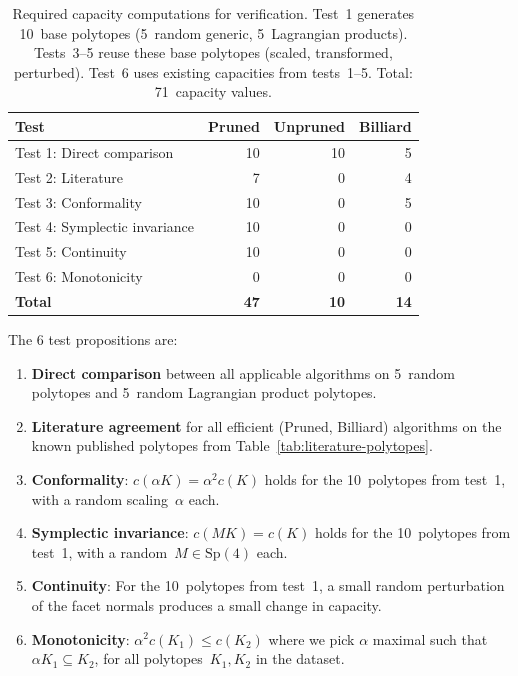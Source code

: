 \begin{table}[h]
\centering
\small
\begin{tabular}{lrrr}
\toprule
Test & Pruned & Unpruned & Billiard \\
\midrule
Test 1: Direct comparison & 10 & 10 & 5 \\
Test 2: Literature & 7 & 0 & 4 \\
Test 3: Conformality & 10 & 0 & 5 \\
Test 4: Symplectic invariance & 10 & 0 & 0 \\
Test 5: Continuity & 10 & 0 & 0 \\
Test 6: Monotonicity & 0 & 0 & 0 \\
\midrule
\textbf{Total} & \textbf{47} & \textbf{10} & \textbf{14} \\
\bottomrule
\end{tabular}
\caption{Required capacity computations for verification. Test~1 generates
  10~base polytopes (5~random generic, 5~Lagrangian products). Tests~3--5
  reuse these base polytopes (scaled, transformed, perturbed). Test~6 uses
  existing capacities from tests~1--5. Total: 71~capacity values.}
\label{tab:verification-capacity-counts}
\end{table}

The 6 test propositions are:
\begin{enumerate}
  \item \textbf{Direct comparison} between all applicable algorithms on
    5~random polytopes and 5~random Lagrangian product polytopes.

  \item \textbf{Literature agreement} for all efficient (Pruned, Billiard)
    algorithms on the known published polytopes from
    Table~\ref{tab:literature-polytopes}.

  \item \textbf{Conformality}: $c(\alpha K) = \alpha^2 c(K)$ holds for the
    10~polytopes from test~1, with a random scaling~$\alpha$ each.

  \item \textbf{Symplectic invariance}: $c(MK) = c(K)$ holds for the
    10~polytopes from test~1, with a random~$M \in \mathrm{Sp}(4)$ each.

  \item \textbf{Continuity}: For the 10~polytopes from test~1, a small
    random perturbation of the facet normals produces a small change in
    capacity.

  \item \textbf{Monotonicity}: $\alpha^2 c(K_1) \le c(K_2)$ where we pick
    $\alpha$ maximal such that~$\alpha K_1 \subseteq K_2$, for all
    polytopes~$K_1, K_2$ in the dataset.
\end{enumerate}

